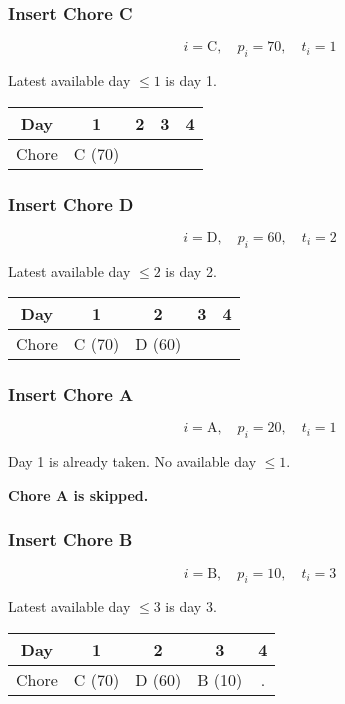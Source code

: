 \documentclass[12pt]{article}
\begin{document}
\subsubsection*{Insert Chore C}

\[
i = \text{C}, \quad p_i = 70, \quad t_i = 1
\]

Latest available day $\leq 1$ is day 1.

\begin{center}
\begin{tabular}{|c|c|c|c|c|}
\hline
Day & 1 & 2 & 3 & 4 \\
\hline
Chore & C (70) & & & \\
\hline
\end{tabular}
\end{center}

\subsubsection*{Insert Chore D}

\[
i = \text{D}, \quad p_i = 60, \quad t_i = 2
\]

Latest available day $\leq 2$ is day 2.

\begin{center}
\begin{tabular}{|c|c|c|c|c|}
\hline
Day & 1 & 2 & 3 & 4 \\
\hline
Chore & C (70) & D (60) & & \\
\hline
\end{tabular}
\end{center}

\subsubsection*{Insert Chore A}

\[
i = \text{A}, \quad p_i = 20, \quad t_i = 1
\]

Day 1 is already taken. No available day $\leq 1$.

\textbf{Chore A is skipped.}

\subsubsection*{Insert Chore B}

\[
i = \text{B}, \quad p_i = 10, \quad t_i = 3
\]

Latest available day $\leq 3$ is day 3.

\begin{center}
\begin{tabular}{|c|c|c|c|c|}
\hline
Day & 1 & 2 & 3 & 4 \\
\hline
Chore & C (70) & D (60) & B (10) & . \\
\hline
\end{tabular}
\end{center}
\end{document}
